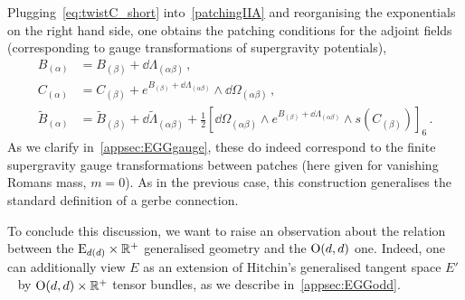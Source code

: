 \documentclass[debug]{phd}
\begin{document}
					Plugging~\eqref{eq:twistC_short} into~\eqref{patchingIIA} and reorganising the exponentials on the right hand side, one obtains the patching conditions for the adjoint fields (corresponding to gauge transformations of supergravity potentials),
							\begin{equation}\label{eq:gauge-field-patchingmassless}
								\begin{split}
									B_{(\alpha)} &= B_{(\beta)} + \dd \Lambda_{(\alpha\beta)} \, , \\
									C_{(\alpha)} &= C_{(\beta)} + e^{B_{(\beta)} +\dd \Lambda_{(\alpha\beta)}} \wedge \dd \Omega_{(\alpha\beta)} \, , \\
									\tilde{B}_{(\alpha)} &= \tilde{B}_{(\beta)} + \dd \tilde \Lambda_{(\alpha\beta)} + \tfrac{1}{2} \left[ \dd \Omega_{(\alpha\beta)} \wedge e^{B_{(\beta)} + \dd \Lambda_{(\alpha\beta)}}\wedge s(C_{(\beta)}) \right]_6 \, .
		 						\end{split}
							\end{equation}
					As we clarify in~\cref{appsec:EGGgauge}, these do indeed correspond to the finite supergravity gauge transformations between patches (here given for vanishing Romans mass, $m=0$). 
					As in the previous case, this construction generalises the standard definition of a gerbe connection.
					
					To conclude this discussion, we want to raise an observation about the relation between the $\mathrm{E}_{d(d)} \times \mathbb{R}^+$ generalised geometry and the $\mathrm{O}(d,d)$ one.
					Indeed, one can additionally view $E$ as an extension of Hitchin's generalised tangent space $E'$~\cite{hitch1,gualtphd} by $\mathrm{O}(d,d)\times\mathbb{R}^+$ tensor bundles, as we describe in~\cref{appsec:EGGodd}.
\end{document}
